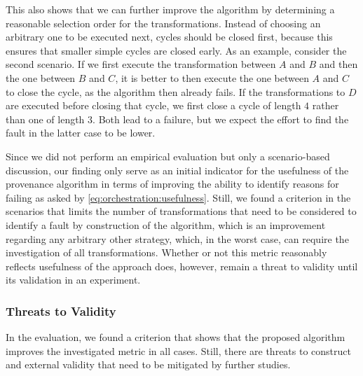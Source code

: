 This also shows that we can further improve the algorithm by determining a reasonable selection order for the transformations.
Instead of choosing an arbitrary one to be executed next, cycles should be closed first, because this ensures that smaller simple cycles are closed early.
As an example, consider the second scenario.
If we first execute the transformation between $A$ and $B$ and then the one between $B$ and $C$, it is better to then execute the one between $A$ and $C$ to close the cycle, as the algorithm then already fails.
If the transformations to $D$ are executed before closing that cycle, we first close a cycle of length $4$ rather than one of length $3$. Both lead to a failure, but we expect the effort to find the fault in the latter case to be lower.

Since we did not perform an empirical evaluation but only a scenario-based discussion, our finding only serve as an initial indicator for the usefulness of the provenance algorithm in terms of improving the ability to identify reasons for failing as asked by \autoref{eq:orchestration:usefulness}.
Still, we found a criterion in the scenarios that limits the number of transformations that need to be considered to identify a fault by construction of the algorithm, which is an improvement regarding any arbitrary other strategy, which, in the worst case, can require the investigation of all transformations.
Whether or not this metric reasonably reflects usefulness of the approach does, however, remain a threat to validity until its validation in an experiment.





\subsubsection{Threats to Validity}

In the evaluation, we found a criterion that shows that the proposed algorithm improves the investigated metric in all cases.
Still, there are threats to construct and external validity that need to be mitigated by further studies.

